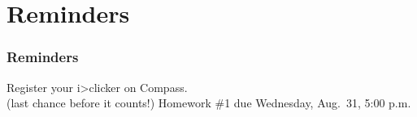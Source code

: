 \documentclass[11pt]{beamer}
\begin{document}
\section{Reminders}

\begin{frame}
  \frametitle{Reminders}
  \Enlarge

  \begin{itemize}
  \myitem  Register your i>clicker on Compass. \\ \textcolor{CS101GradBot}{(last chance before it counts!)}
  \myitem  Homework \#1 due Wednesday, Aug.\ 31, 5:00 p.m.
  \end{itemize}
\end{frame}
\end{document}

